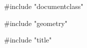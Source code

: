 #include "documentclass"
\usepackage[utf8]{inputenc}
\usepackage[T1]{fontenc}
\usepackage[hidelinks]{hyperref}

#include "geometry"
\newif\ifpdf
\ifx\pdfoutput\undefined
  \pdffalse
\else
  \ifnum{}
    \pdftrue
  \else
    \pdffalse
  \fi
\fi

#include "title"
\author{}
\date{}




\thispagestyle{empty}
\clearpage
